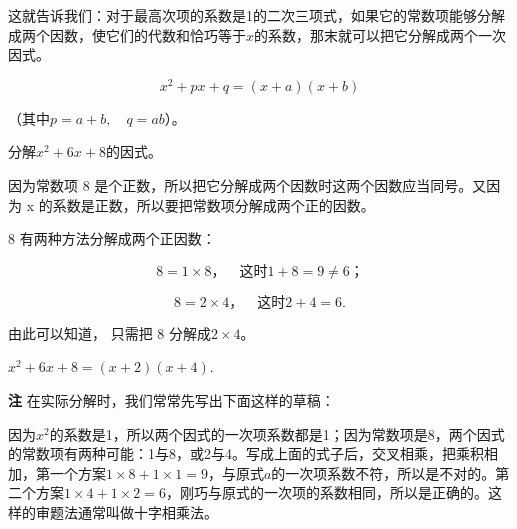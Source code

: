 这就告诉我们：对于最高次项的系数是1的二次三项式，如果它的常数项能够分解成两个因数，使它们的代数和恰巧等于\(x\)的系数，那末就可以把它分解成两个一次因式。

\[
x ^{2} + p x + q = (x + a) (x + b)
\]

（其中\(p=a+b,\quad q=ab\)）。

 分解\(x^{2} + 6x + 8\)的因式。

 因为常数项 8
是个正数，所以把它分解成两个因数时这两个因数应当同号。又因为 x
的系数是正数，所以要把常数项分解成两个正的因数。

8 有两种方法分解成两个正因数：

\[
8 = 1 \times 8\text{，} \quad \text{这时} 1 + 8 = 9 \neq 6\text{；}
\]

\[
8 = 2 \times 4\text{，} \quad \text{这时} 2 + 4 = 6.
\]

由此可以知道， 只需把 8 分解成\(2 \times 4\)。

\(x^{2} + 6x + 8 = (x + 2)(x + 4).\)

\textbf{注} 在实际分解时，我们常常先写出下面这样的草稿：

\begin{figure}
\centering
\end{figure}

因为\(x^{2}\)的系数是1，所以两个因式的一次项系数都是1；因为常数项是8，两个因式的常数项有两种可能：1与8，或2与4。写成上面的式子后，交叉相乘，把乘积相加，第一个方案\(1 \times 8 + 1 \times 1 = 9\)，与原式\(a\)的一次项系数不符，所以是不对的。第二个方案\(1 \times 4 + 1 \times 2 = 6\)，刚巧与原式的一次项的系数相同，所以是正确的。这样的审题法通常叫做十字相乘法。

